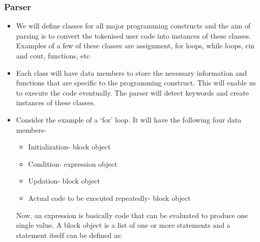 \documentclass{article}
\begin{document}
\subsubsection{Parser}
\begin{itemize}
\item We will define classes for all major programming constructs and the aim of parsing is to convert the tokenised user code into instances of these classes. Examples of a few of these classes are assignment, for loops, while loops, cin and cout, functions, etc.
\item Each class will have data members to store the necessary information and functions that are specific to the programming construct. This will enable us to execute the code eventually. The parser will detect keywords and create instances of these classes.
\item Consider the example of a `for' loop. It will have the following four data members-
\begin{itemize}
\item Initialization- block object
\item Condition- expression object
\item Updation- block object
\item Actual code to be executed repeatedly- block object
\end{itemize}
Now, an expression is basically code that can be evaluated to produce one single value. A block object is a list of one or more statements and a statement itself can be defined as:



\end{itemize}
\end{document}
